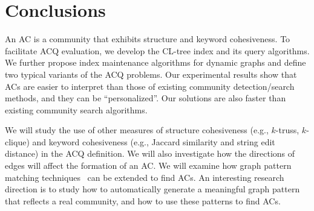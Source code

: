 \section{Conclusions}
\label{conclusion}

An AC is a community that exhibits structure and keyword cohesiveness. To facilitate ACQ evaluation, we develop the CL-tree index and its query algorithms. We further propose index maintenance algorithms for dynamic graphs and define two typical variants of the ACQ problems.
Our experimental results show that ACs are
easier to interpret than those of existing community detection/search methods,
and they can be ``personalized''. Our solutions are also faster than existing community search algorithms.

We will study the use of other measures of structure cohesiveness (e.g., $k$-truss, $k$-clique) and keyword cohesiveness (e.g., Jaccard similarity and string edit distance) in the ACQ definition.
We will also investigate how the directions of edges will affect the formation of an AC.
We will examine how graph pattern matching techniques~\cite{GPM-KDD2007,GPM-VLDB2010,GPM-PVLDB2015} can be extended to find ACs. An interesting research direction is to study how to automatically generate a meaningful graph pattern that reflects a real community, and how to use these patterns to find ACs.

